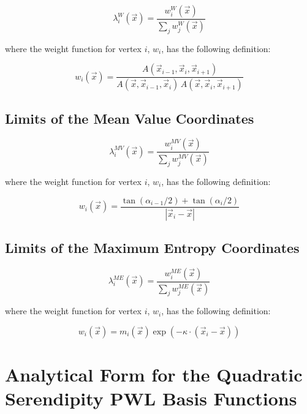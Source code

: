 \begin{equation}
\label{eq::App_BF_WachBF}
\lambda_i^{W} (\vec{x}) = \frac{w_i^W  (\vec{x}) }{\sum_j w_j^W  (\vec{x}) }
\end{equation}

\noindent where the weight function for vertex $i$, $w_i$, has the following definition:

\begin{equation}
\label{eq::BF_wach_weights}
w_i (\vec{x})  = \frac{A(\vec{x}_{i-1}, \vec{x}_{i}, \vec{x}_{i+1})}{A(\vec{x}, \vec{x}_{i-1}, \vec{x}_{i}) \, A(\vec{x}, \vec{x}_{i}, \vec{x}_{i+1})}
\end{equation}

\subsection{Limits of the Mean Value Coordinates}
\label{sec::appendix_BF_Limits_MV}

\begin{equation}
\label{eq::App_BF_MVBF}
\lambda_i^{MV} (\vec{x}) = \frac{w_i^{MV}  (\vec{x}) }{\sum_j w_j^{MV}  (\vec{x}) }
\end{equation}

\noindent where the weight function for vertex $i$, $w_i$, has the following definition:

\begin{equation}
\label{eq::BF_MV_weights}
w_i (\vec{x})  = \frac{\tan(\alpha_{i-1} / 2) + \tan(\alpha_i / 2)}{|\vec{x}_i - \vec{x}|}
\end{equation}

\subsection{Limits of the Maximum Entropy Coordinates}
\label{sec::appendix_BF_Limits_ME}


\begin{equation}
\label{eq::App_BF_MEBF}
\lambda_i^{ME} (\vec{x}) = \frac{w_i^{ME}  (\vec{x}) }{\sum_j w_j^{ME}  (\vec{x}) }
\end{equation}

\noindent where the weight function for vertex $i$, $w_i$, has the following definition:

\begin{equation}
\label{eq::BF_ME_weights}
w_i (\vec{x})  = m_i(\vec{x}) \exp(-  \kappa \cdot (\vec{x}_i - \vec{x}))
\end{equation}

\section{Analytical Form for the Quadratic Serendipity PWL Basis Functions}
\label{sec::appendix_BF_PWQ}

